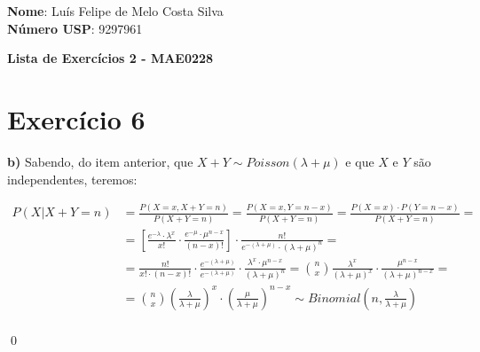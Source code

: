 \documentclass[12pt,letterpaper]{article}
\begin{document}
	
	\textbf{Nome}: Luís Felipe de Melo Costa Silva \\
	\textbf{Número USP}: 9297961 
	
	\begin{center}
		\LARGE \bf
		Lista de Exercícios 2 - MAE0228
	\end{center}
	
	\section*{Exercício 6}
	
	\textbf{b)} Sabendo, do item anterior, que $X+Y \sim Poisson(\lambda + \mu)$ e que $X$ e $Y$ são independentes, teremos: 
	
	\begin{equation*}
		\begin{split}
			P(X|X+Y=n) & = \frac{P(X=x, X+Y=n)}{P(X+Y=n)} = \frac{P(X=x, Y=n-x)}{P(X+Y=n)} = \frac{P(X=x) \cdot P(Y=n-x)}{P(X+Y=n)} =\\
			& = \left[\frac{e^{-\lambda} \cdot \lambda^x}{x!} \cdot \frac{e^{-\mu} \cdot \mu^{n-x}}{(n-x)!}\right] \cdot \frac{n!}{e^{-(\lambda+\mu)}\cdot(\lambda+\mu)^n} = \\
			& = \frac{n!}{x!\cdot(n-x)!} \cdot \frac{e^{-(\lambda+\mu)}}{e^{-(\lambda+\mu)}} \cdot \frac{\lambda^x \cdot \mu^{n-x}}{(\lambda+\mu)^n} = \binom{n}{x} \frac{\lambda^x}{(\lambda+\mu)^x} \cdot \frac{\mu^{n-x}}{(\lambda+\mu)^{n-x}} = \\
			& = \binom{n}{x} \left(\frac{\lambda}{\lambda+\mu}\right)^x \cdot \left(\frac{\mu}{\lambda+\mu}\right)^{n-x} \sim Binomial\left(n, \frac{\lambda}{\lambda+\mu}\right)\\
		\end{split}
	\end{equation*}
	
	\qed
	
\end{document}
